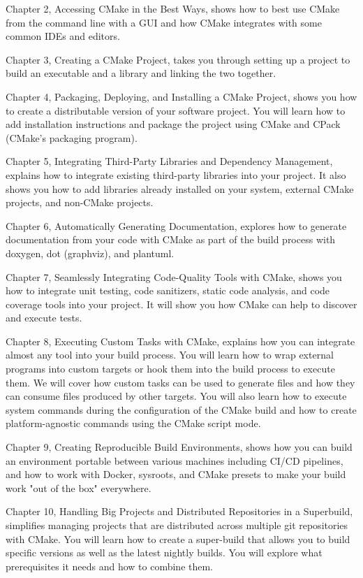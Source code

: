 Chapter 2, Accessing CMake in the Best Ways, shows how to best use CMake from the command line with a GUI and how CMake integrates with some common IDEs and editors.

Chapter 3, Creating a CMake Project, takes you through setting up a project to build an executable and a library and linking the two together.

Chapter 4, Packaging, Deploying, and Installing a CMake Project, shows you how to create a distributable version of your software project. You will learn how to add installation instructions and package the project using CMake and CPack (CMake's packaging program).

Chapter 5, Integrating Third-Party Libraries and Dependency Management, explains how to integrate existing third-party libraries into your project. It also shows you how to add libraries already installed on your system, external CMake projects, and non-CMake projects.

Chapter 6, Automatically Generating Documentation, explores how to generate documentation from your code with CMake as part of the build process with doxygen, dot (graphviz), and plantuml.

Chapter 7, Seamlessly Integrating Code-Quality Tools with CMake, shows you how to integrate unit testing, code sanitizers, static code analysis, and code coverage tools into your project. It will show you how CMake can help to discover and execute tests.

Chapter 8, Executing Custom Tasks with CMake, explains how you can integrate almost any tool into your build process. You will learn how to wrap external programs into custom targets or hook them into the build process to execute them. We will cover how custom tasks can be used to generate files and how they can consume files produced by other targets. You will also learn how to execute system commands during the configuration of the CMake build and how to create platform-agnostic commands using the CMake script mode.

Chapter 9, Creating Reproducible Build Environments, shows how you can build an environment portable between various machines including CI/CD pipelines, and how to work with Docker, sysroots, and CMake presets to make your build work "out of the box" everywhere.

Chapter 10, Handling Big Projects and Distributed Repositories in a Superbuild, simplifies managing projects that are distributed across multiple git repositories with CMake. You will learn how to create a super-build that allows you to build specific versions as well as the latest nightly builds. You will explore what prerequisites it needs and how to combine them.

